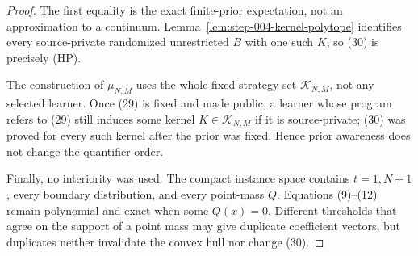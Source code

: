 \begin{proof}
The first equality is the exact finite-prior expectation, not an
approximation to a continuum. Lemma~\ref{lem:step-004-kernel-polytope}
identifies every source-private randomized unrestricted \(B\) with one such
\(K\), so (30) is precisely (HP).

The construction of \(\mu_{N,M}\) uses the whole fixed strategy set
\(\mathcal K_{N,M}\), not any selected learner. Once (29) is fixed and made
public, a learner whose program refers to (29) still induces some kernel
\(K\in\mathcal K_{N,M}\) if it is source-private; (30) was proved for every
such kernel after the prior was fixed. Hence prior awareness does not change
the quantifier order.

Finally, no interiority was used. The compact instance space contains
\(t=1,N+1\), every boundary distribution, and every point-mass \(Q\).
Equations (9)--(12) remain polynomial and exact when some \(Q(x)=0\).
Different thresholds that agree on the support of a point mass may give
duplicate coefficient vectors, but duplicates neither invalidate the convex
hull nor change (30). \end{proof}
